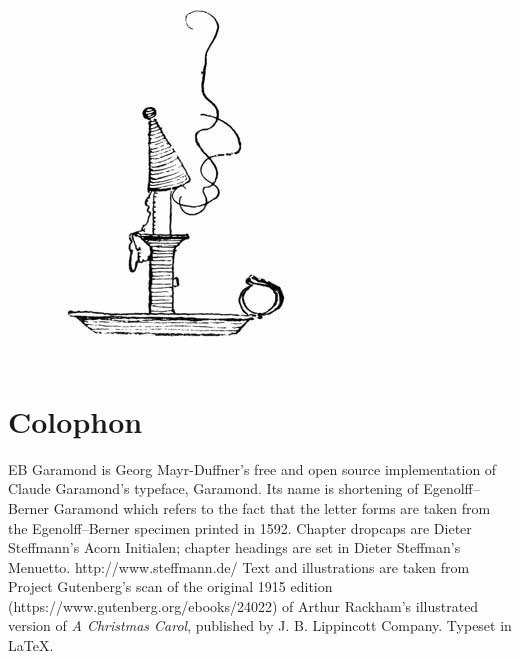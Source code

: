 \documentclass[paper=a5,BCOR=15mm,twoside,DIV=15,headinclude=off,12pt,chapterprefix=off,openany,headings=huge]{scrbook} %
\begin{document}
\begin{figure}
\centering
\includegraphics[width=.5\linewidth]{gs182}
\end{figure}
\pagestyle{empty}
\chapter*{Colophon}
\centering
EB Garamond is Georg Mayr-Duffner's free and open source implementation of Claude Garamond’s typeface, Garamond. Its name is shortening of Egenolff–Berner Garamond which refers to the fact that the letter forms are taken from the Egenolff–Berner specimen printed in 1592.
\vfill
Chapter dropcaps are Dieter Steffmann's Acorn Initialen; chapter headings are set in Dieter Steffman's Menuetto. http://www.steffmann.de/
\vfill
Text and illustrations are taken from Project Gutenberg's scan of the original 1915 edition (https://www.gutenberg.org/ebooks/24022) of Arthur Rackham's illustrated version of \textit{A Christmas Carol}, published by J. B. Lippincott Company.
\vfill
Typeset in \LaTeX{}.
\end{document}
